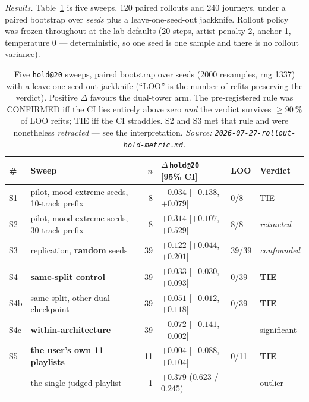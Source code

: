 \documentclass[11pt]{article}
\newcommand{\best}[1]{\textbf{#1}}
\begin{document}
\emph{Results.} Table~\ref{tab:nexttrack-rollout} is five sweeps, \num{120} paired
rollouts and \num{240} journeys, under a paired bootstrap over \emph{seeds} plus a
leave-one-seed-out jackknife. Rollout policy was frozen throughout at the lab
defaults (\num{20} steps, artist penalty \num{2}, anchor \num{1}, temperature
\num{0} --- deterministic, so one seed is one sample and there is no rollout
variance).

\begin{table}[ht]
  \centering
  \caption{Five \texttt{hold@20} sweeps, paired bootstrap over seeds (\num{2000}
  resamples, rng \num{1337}) with a leave-one-seed-out jackknife (``LOO'' is the
  number of refits preserving the verdict). Positive $\Delta$ favours the
  dual-tower arm. The pre-registered rule was CONFIRMED iff the CI lies entirely
  above zero \emph{and} the verdict survives $\ge\SI{90}{\percent}$ of LOO refits;
  TIE iff the CI straddles. S2 and S3 met that rule and were nonetheless
  \emph{retracted} --- see the interpretation.
  \emph{Source: \texttt{2026-07-27-rollout-hold-metric.md}.}}
  \label{tab:nexttrack-rollout}
  {\footnotesize\setlength{\tabcolsep}{4pt}\begin{tabular}{llrlll}
    \toprule
    \# & Sweep & $n$ & $\Delta$\,\texttt{hold@20} [95\% CI] & LOO & Verdict \\
    \midrule
    S1 & pilot, mood-extreme seeds, 10-track prefix & 8 & $-0.034$ [$-0.138$, $+0.079$] & 0/8 & TIE \\
    S2 & pilot, mood-extreme seeds, 30-track prefix & 8 & $+0.314$ [$+0.107$, $+0.529$] & 8/8 & \emph{retracted} \\
    S3 & replication, \textbf{random} seeds & 39 & $+0.122$ [$+0.044$, $+0.201$] & 39/39 & \emph{confounded} \\
    S4 & \textbf{same-split control} & 39 & $+0.033$ [$-0.030$, $+0.093$] & 0/39 & \best{TIE} \\
    S4b & same-split, other dual checkpoint & 39 & $+0.051$ [$-0.012$, $+0.118$] & 0/39 & \best{TIE} \\
    S4c & \textbf{within-architecture} & 39 & $-0.072$ [$-0.141$, $-0.002$] & --- & significant \\
    S5 & \textbf{the user's own \num{11} playlists} & 11 & $+0.004$ [$-0.088$, $+0.104$] & 0/11 & \best{TIE} \\
    --- & the single judged playlist & 1 & $+0.379$ (\num{0.623} / \num{0.245}) & --- & outlier \\
    \bottomrule
  \end{tabular}}
\end{table}
\end{document}

